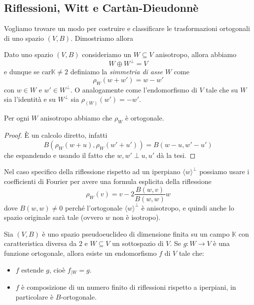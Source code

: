 \documentclass[11pt]{scrartcl}
\newcommand{\KK}{\mathbb{K}}
\begin{document}
	\subsection{Riflessioni, Witt e Cartàn-Dieudonnè}
	
	Vogliamo trovare un modo per costruire e classificare le trasformazioni ortogonali di uno spazio $(V,B)$. Dimostriamo allora
	\begin{definition}[Simmetria]
		Dato uno spazio $(V,B)$ consideriamo un $W\subseteq V$ anisotropo, allora abbiamo
		$$W\oplus W^\perp = V$$
		e dunque se $\text{car}\KK\ne 2$ definiamo la \textit{simmetria di asse $W$} come
		$$\rho_W(w+w')=w-w'$$
		con $w\in W$ e $w'\in W^\perp$. O analogamente come l'endomorfismo di $V$ tale che su $W$ sia l'identità e su $W^\perp$ sia $\rho_(W)(w')=-w'$. 
	\end{definition}
	\begin{lemma}
		Per ogni $W$ anisotropo abbiamo che $\rho_W$ è ortogonale.
	\end{lemma}
	\begin{proof}
		\`E un calcolo diretto, infatti
		$$B\left(\rho_W(w+u),\rho_W(w'+u')\right)=B\left(w-u,w'-u'\right)$$
		che espandendo e usando il fatto che $w,w'\perp u,u'$ dà la tesi.
	\end{proof}
	Nel caso specifico della riflessione rispetto ad un iperpiano $\langle w \rangle^\perp$ possiamo usare i coefficienti di Fourier per avere una formula esplicita della riflessione
	$$\rho_W(v)=v-2\frac{B(w,v)}{B(w,w)}w$$
	dove $B(w,w)\ne 0$ perché l'ortogonale $\langle w \rangle^\perp$ è anisotropo, e quindi anche lo spazio originale sarà tale (ovvero $w$ non è isotropo). 
	\begin{theorem}
		Sia $(V,B)$ è uno spazio pseudoeuclideo di dimensione finita su un campo $\KK$ con caratteristica diversa da $2$ e $W\subseteq V$ un sottospazio di $V$. Se $g:W\to V$ è una funzione ortogonale, allora esiste un endomorfismo $f$ di $V$ tale che:
		\begin{itemize}
			\item $f$ estende $g$, cioè $f_{\mid W}=g$.
			\item $f$ è composizione di un numero finito di riflessioni rispetto a iperpiani, in particolare è $B$-ortogonale.
		\end{itemize}
	\end{theorem}
\end{document}
